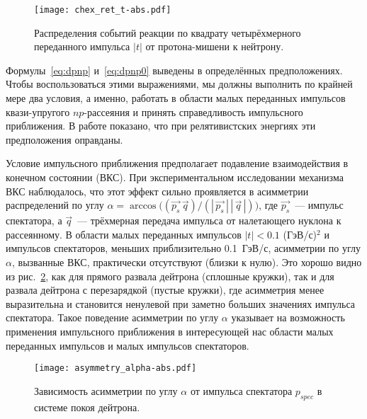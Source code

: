 \begin{figure}[h]
  \centering
  \vspace{-2ex}
  \texttt{[image: chex\_ret\_t-abs.pdf]}
  \vspace{-2ex}
  \caption{Распределения событий реакции \dpfrag по квадрату четырёхмерного
    переданного импульса $|t|$ от протона-мишени к нейтрону.}
  \label{fig:chex_ret_t}
\end{figure}

Формулы~\eqref{eq:dpnp} и~\eqref{eq:dpnp0} выведены в определённых
предположениях. Чтобы воспользоваться этими выражениями, мы должны выполнить по
крайней мере два условия, а именно, работать в области малых переданных
импульсов квази-упругого $np$-рассеяния и принять справедливость импульсного
приближения. В работе показано, что при релятивистских энергиях эти
предположения оправданы.

Условие импульсного приближения предполагает подавление взаимодействия в
конечном состоянии (ВКС). При экспериментальном исследовании механизма ВКС
наблюдалось, что этот эффект сильно проявляется в асимметрии распределений по
углу $\alpha = \arccos{\bigl((\vec{p_s}\,\vec{q})/
  (|\,\vec{p_s}\,|\,|\,\vec{q}\,|)\bigr)}$, где $\vec{p_s}$~--- импульс
спектатора, а $\vec{q}$~--- трёхмерная передача импульса от налетающего нуклона
к рассеянному. В области малых переданных импульсов $|t| < 0.1$ (ГэВ/с)$^2$ и
импульсов спектаторов, меньших приблизительно 0.1~ГэВ/с, асимметрии по углу
$\alpha$, вызванные ВКС, практически отсутствуют (близки к нулю). Это хорошо
видно из рис.~\ref{fig:asymmetry_alpha}, как для прямого развала дейтрона
(сплошные кружки), так и для развала дейтрона с перезарядкой (пустые кружки),
где асимметрия менее выразительна и становится ненулевой при заметно больших
значениях импульса спектатора. Такое поведение асимметрии по углу $\alpha$
указывает на возможность применения импульсного приближения в интересующей нас
области малых переданных импульсов и малых импульсов спектаторов.

\begin{figure}[h]
  \centering
  \vspace{-2ex}
  \texttt{[image: asymmetry\_alpha-abs.pdf]}
  \vspace{-2ex}
  \caption{Зависимость асимметрии по углу $\alpha$ от импульса спектатора
    $p_{spec}$ в системе покоя дейтрона.}
  \label{fig:asymmetry_alpha}
\end{figure}

